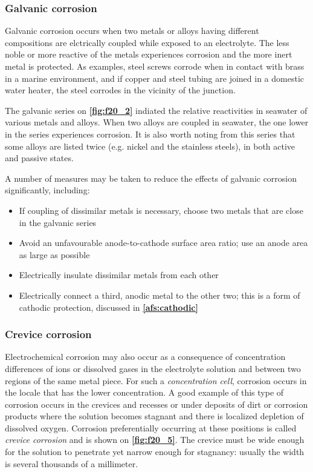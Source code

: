 \subsubsection{Galvanic corrosion}
Galvanic corrosion occurs when two metals or alloys having different compositions are elctrically coupled while exposed to an electrolyte. The less noble or more reactive of the metals experiences corrosion and the more inert metal is protected. As examples, steel screws corrode when in contact with brass in a marine environment, and if copper and steel tubing are joined in a domestic water heater, the steel corrodes in the vicinity of the junction. 

The galvanic series on \textbf{\autoref{fig:f20_2}} indiated the relative reactivities in seawater of various metals and alloys. When two alloys are coupled in seawater, the one lower in the series experiences corrosion. It is also worth noting from this series that some alloys are listed twice (e.g. nickel and the stainless steels), in both active and passive states. 

A number of measures may be taken to reduce the effects of galvanic corrosion significantly, including:
\begin{itemize}
  \item If coupling of dissimilar metals is necessary, choose two metals that are close in the galvanic series
  \item Avoid an unfavourable anode-to-cathode surface area ratio; use an anode area as large as possible
  \item Electrically insulate dissimilar metals from each other
  \item Electrically connect a third, anodic metal to the other two; this is a form of cathodic protection, discussed in \textbf{\autoref{afs:cathodic}}
\end{itemize}

\subsubsection{Crevice corrosion}
Electrochemical corrosion may also occur as a consequence of concentration differences of ions or dissolved gases in the electrolyte solution and between two regions of the same metal piece. For such a \textit{concentration cell}, corrosion occurs in the locale that has the lower concentration. A good example of this type of corrosion occurs in the crevices and recesses or under deposits of dirt or corrosion products where the solution becomes stagnant and there is localized depletion of dissolved oxygen. Corrosion preferentially occurring at these positions is called \textit{crevice corrosion} and is shown on \textbf{\autoref{fig:f20_5}}. The crevice must be wide enough for the solution to penetrate yet narrow enough for stagnancy: usually the width is several thousands of a millimeter.

